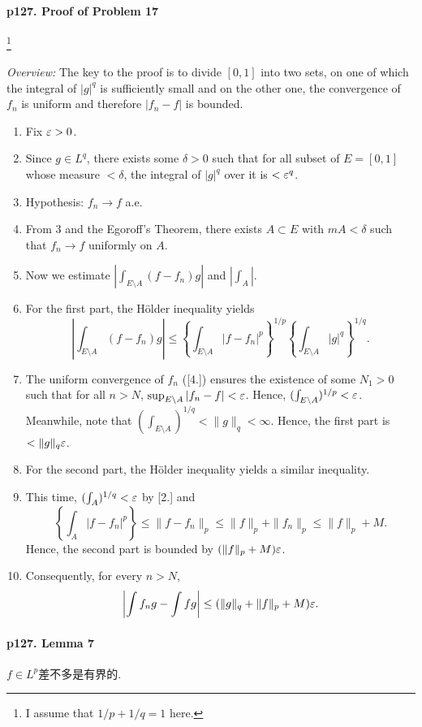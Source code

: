   \paragraph{p127. Proof of Problem 17}
    \footnote{I assume that $1/p+1/q=1$ here.}
    $\,$\par
    \textit{Overview:} The key to the proof is to divide $[0,1]$ into two sets,
    on one of which the integral of $|g|^q$ is sufficiently small and on the
    other one, the convergence of $f_n$ is uniform and therefore $|f_n-f|$ is 
    bounded.
    \begin{enumerate}
      \item Fix $\varepsilon>0$.
      \item Since $g\in L^q$, there exists some $\delta>0$ such that for all 
            subset of $E=[0,1]$ whose measure $<\delta$, the integral of $|g|^q$
            over it is $<\varepsilon^q$.
      \item Hypothesis: $f_n\to f$ a.e.
      \item From 3 and the Egoroff's Theorem, there exists $A\subset E$ with $m
            A<\delta$ such that $f_n\to f$ uniformly on $A$.
      \item Now we estimate $|\int_{E\setminus A}(f-f_n)g|$ and $|\int_A|$.
      \item For the first part, the Hölder inequality yields
            \[
              \left|\int_{E\setminus A}(f-f_n)g\right| \le
              \left\{\int_{E\setminus A}|f-f_n|^p\right\}^{1/p}
              \left\{\int_{E\setminus A}|g|^q\right\}^{1/q}.
            \]
      \item The uniform convergence of $f_n$ ([4.]) ensures the existence of 
            some $N_1>0$ such that for all $n>N$, $\sup_{E\setminus A}|f_n-f|
            <\varepsilon$. Hence, $(\int_{E\setminus A})^{1/p}<\varepsilon$. Meanwhile, note 
            that $(\int_{E\setminus A})^{1/q}<\|g\|_q<\infty$. Hence, the 
            first part is $< \|g\|_q\varepsilon$.
      \item For the second part, the Hölder inequality yields a similar 
            inequality.
      \item This time, $(\int_A)^{1/q}<\varepsilon$ by [2.] and
            \[
              \left\{\int_A|f-f_n|^p\right\} \le \|f-f_n\|_p \le 
              \|f\|_p + \|f_n\|_p \le \|f\|_p + M.
            \]
            Hence, the second part is bounded by $(\|f\|_p+M)\varepsilon$.
      \item Consequently, for every $n>N$,
            \[
              \left|\int f_ng - \int fg\right| \le 
              (\|g\|_q+\|f\|_p+M)\varepsilon.
            \]
    \end{enumerate}

  \paragraph{p127. Lemma 7}
    $f\in L^p$差不多是有界的.

  



